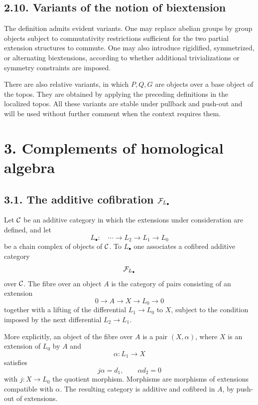 \documentclass[11pt]{article}
\theoremstyle{plain}
\theoremstyle{definition}
\theoremstyle{remark}
\begin{document}
\subsection*{2.10. Variants of the notion of biextension}

The definition admits evident variants. One may replace abelian groups by group
objects subject to commutativity restrictions sufficient for the two partial
extension structures to commute. One may also introduce rigidified, symmetrized,
or alternating biextensions, according to whether additional trivializations or
symmetry constraints are imposed.

There are also relative variants, in which \(P,Q,G\) are objects over a base
object of the topos. They are obtained by applying the preceding definitions in
the localized topos. All these variants are stable under pullback and push-out
and will be used without further comment when the context requires them.

\section*{3. Complements of homological algebra}

\subsection*{3.1. The additive cofibration \(\mathcal F_{L_\bullet}\)}

Let \(\mathcal C\) be an additive category in which the extensions under consideration
are defined, and let
\[
L_\bullet:\quad \cdots\longrightarrow L_2\longrightarrow L_1
        \longrightarrow L_0
\]
be a chain complex of objects of \(\mathcal C\). To \(L_\bullet\) one associates a
cofibred additive category
\[
\mathcal F_{L_\bullet}
\]
over \(\mathcal C\). The fibre over an object \(A\) is the category of pairs consisting
of an extension
\[
0\longrightarrow A\longrightarrow X\longrightarrow L_0\longrightarrow 0
\]
together with a lifting of the differential \(L_1\to L_0\) to \(X\), subject to
the condition imposed by the next differential \(L_2\to L_1\).

More explicitly, an object of the fibre over \(A\) is a pair \((X,\alpha)\),
where \(X\) is an extension of \(L_0\) by \(A\) and
\[
\alpha:L_1\longrightarrow X
\]
satisfies
\[
j\alpha=d_1,\qquad \alpha d_2=0
\]
with \(j:X\to L_0\) the quotient morphism. Morphisms are morphisms of extensions
compatible with \(\alpha\). The resulting category is additive and cofibred in
\(A\), by push-out of extensions.
\end{document}
